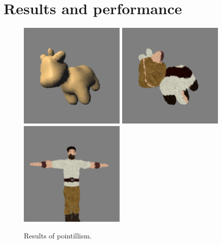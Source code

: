 \chapter{Results and performance}

\begin{figure}
    \begin{center}
    \includegraphics[width=50mm, height=50mm]{Resultats/spotPoint/final.png}
    \includegraphics[width=50mm, height=50mm]{Resultats/spotPoint/final2.png}
    \includegraphics[width=50mm, height=50mm]{Resultats/pointCharacter/final.png}
    \end{center}
    \caption{Results of pointillism.}
    \label{results_point}
\end{figure}


